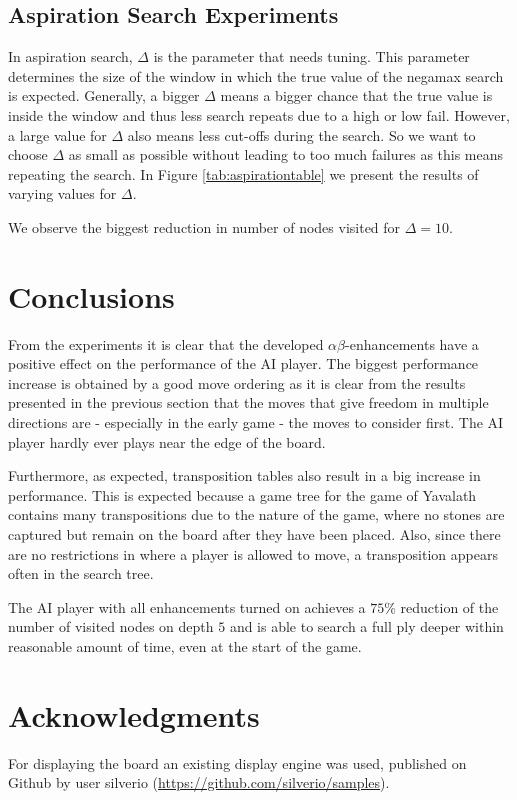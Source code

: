 \documentclass[11pt]{article}
\begin{document}
\subsection{Aspiration Search Experiments}
\label{-subsec:aspirationsearchexperiments}
In aspiration search, $\Delta$ is the parameter that needs tuning. This parameter determines the size of the window in which the true value of the negamax search is expected. Generally, a bigger $\Delta$ means a bigger chance that the true value is inside the window and thus less search repeats due to a high or low fail. However, a large value for $\Delta$ also means less cut-offs during the search. So we want to choose $\Delta$ as small as possible without leading to too much failures as this means repeating the search. In Figure \ref{tab:aspirationtable} we present the results of varying values for $\Delta$.



We observe the biggest reduction in number of nodes visited for $\Delta=10$.

\section{Conclusions}
\label{-sec:conclusions}
From the experiments it is clear that the developed $\alpha\beta$-enhancements have a positive effect on the performance of the AI player. The biggest performance increase is obtained by a good move ordering as it is clear from the results presented in the previous section that the moves that give freedom in multiple directions are - especially in the early game - the moves to consider first. The AI player hardly ever plays near the edge of the board.

Furthermore, as expected, transposition tables also result in a big increase in performance. This is expected because a game tree for the game of Yavalath contains many transpositions due to the nature of the game, where no stones are captured but remain on the board after they have been placed. Also, since there are no restrictions in where a player is allowed to move, a transposition appears often in the search tree.

The AI player with all enhancements turned on achieves a $75\%$ reduction of the number of visited nodes on depth $5$ and is able to search a full ply deeper within reasonable amount of time, even at the start of the game.

\section{Acknowledgments}
\label{-sec:acknowledgments}
For displaying the board an existing display engine was used, published on Github by user silverio (\url{https://github.com/silverio/samples}).

\clearpage
	\nocite{*}
	\printbibliography
\end{document}
